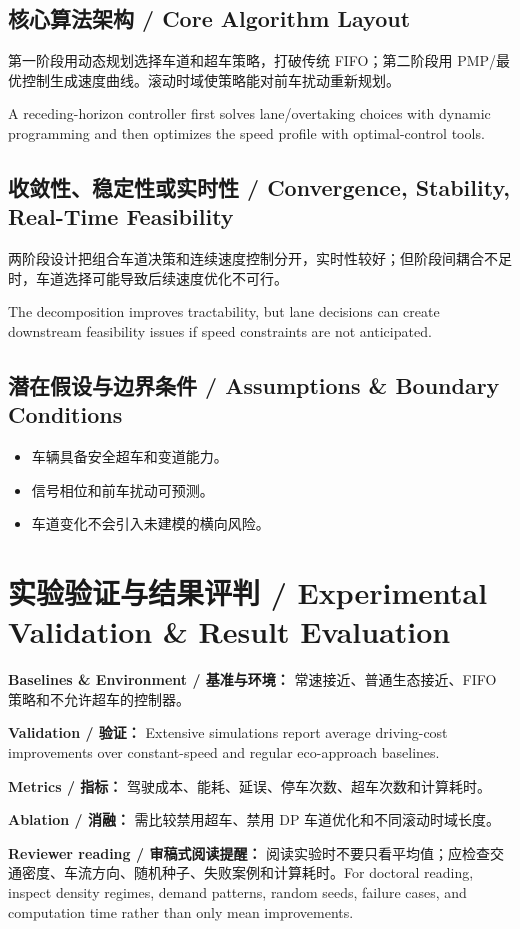 \documentclass[UTF8,a4paper,11pt,fontset=fandol]{ctexart}
\begin{document}
\subsection{核心算法架构 / Core Algorithm Layout}
第一阶段用动态规划选择车道和超车策略，打破传统 FIFO；第二阶段用 PMP/最优控制生成速度曲线。滚动时域使策略能对前车扰动重新规划。

A receding-horizon controller first solves lane/overtaking choices with dynamic programming and then optimizes the speed profile with optimal-control tools.

\subsection{收敛性、稳定性或实时性 / Convergence, Stability, Real-Time Feasibility}
两阶段设计把组合车道决策和连续速度控制分开，实时性较好；但阶段间耦合不足时，车道选择可能导致后续速度优化不可行。

The decomposition improves tractability, but lane decisions can create downstream feasibility issues if speed constraints are not anticipated.

\subsection{潜在假设与边界条件 / Assumptions \& Boundary Conditions}
\begin{itemize}
\item 车辆具备安全超车和变道能力。
\item 信号相位和前车扰动可预测。
\item 车道变化不会引入未建模的横向风险。
\end{itemize}


\section{实验验证与结果评判 / Experimental Validation \& Result Evaluation}
\textbf{Baselines \& Environment / 基准与环境：} 常速接近、普通生态接近、FIFO 策略和不允许超车的控制器。

\textbf{Validation / 验证：} Extensive simulations report average driving-cost improvements over constant-speed and regular eco-approach baselines.

\textbf{Metrics / 指标：} 驾驶成本、能耗、延误、停车次数、超车次数和计算耗时。

\textbf{Ablation / 消融：} 需比较禁用超车、禁用 DP 车道优化和不同滚动时域长度。

\textbf{Reviewer reading / 审稿式阅读提醒：} 阅读实验时不要只看平均值；应检查交通密度、车流方向、随机种子、失败案例和计算耗时。For doctoral reading, inspect density regimes, demand patterns, random seeds, failure cases, and computation time rather than only mean improvements.
\end{document}
